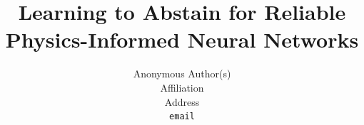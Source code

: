 \documentclass{article}
\title{Learning to Abstain for Reliable Physics-Informed Neural Networks}
\author{%
  Anonymous Author(s) \\
  Affiliation \\
  Address \\
  \texttt{email}
}
\begin{document}
\maketitle

\begin{abstract}

\end{abstract}














\appendix

\end{document}
